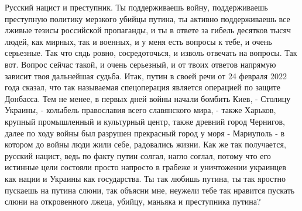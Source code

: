  
 
 
 
 

Русский нацист и преступник. Ты поддерживаешь войну, поддерживаешь преступную
политику мерзкого убийцы путина, ты активно поддерживаешь все лживые тезисы
российской пропаганды, и ты в ответе за гибель десятков тысяч людей, как
мирных, так и военных, и у меня есть вопросы к тебе, и очень серьезные. Так что
сядь ровно, сосредоточься, и изволь отвечать на вопросы.  Так вот. Вопрос
сейчас такой, и очень серьезный, и от твоих ответов напрямую зависит твоя
дальнейшая судьба. Итак, путин в своей речи от 24 февраля 2022 года сказал, что
так называемая спецоперация является операцией по защите Донбасса. Тем не
менее, в первых дней войны начали бомбить Киев, - Столицу Украины, - колыбель
православия всего славянского мира, - также Харьков, крупный промышленный и
культурный центр, также древний город Чернигов, далее по ходу войны был
разрушен прекрасный город у моря - Мариуполь - в котором до войны люди жили
себе, радовались жизни. Как же так получается, русский нацист, ведь по факту
путин солгал, нагло соглал, потому что его истинные цели состояли просто
напросто в грабеже и уничтожении украинцев как нации и Украины как государства.
Ты так любишь путина, ты так яростно пускаешь на путина слюни, так объясни мне,
неужели тебе так нравится пускать слюни на откровенного лжеца, убийцу, маньяка и
преступника путина?
